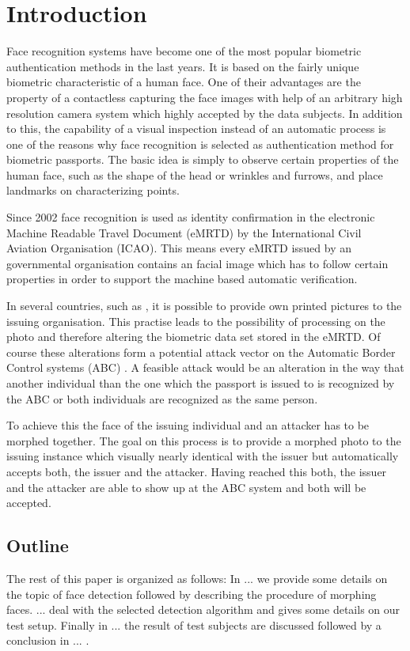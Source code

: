 \section{Introduction}
Face recognition systems have become one of the most popular biometric authentication methods in the last years. It is based on the fairly unique biometric characteristic of a human face. One of their advantages are the property of a contactless capturing the face images with help of an arbitrary high resolution camera system which highly accepted by the data subjects. In addition to this, the capability of a visual inspection instead of an automatic process is one of the reasons why face recognition is selected as authentication method for biometric passports. 
The basic idea is simply to observe certain properties of the human face, such as the shape of the head or wrinkles and furrows, and place landmarks on characterizing points. 


Since 2002  face recognition is used as identity confirmation in the electronic 
Machine Readable Travel Document (eMRTD) by the  International Civil Aviation Organisation (ICAO). This means every eMRTD issued by an governmental organisation contains an facial image which has to follow certain properties in order to support the machine based automatic verification. 

In several countries, such as , it is possible to provide own printed pictures to the issuing organisation. This practise leads to the possibility of processing on the photo and therefore altering the biometric data set stored in the eMRTD. Of course these alterations form a potential attack vector on the Automatic Border Control systems (ABC) . A feasible attack would be an alteration in the way that another individual than the one which the passport is issued to is recognized by the ABC or both individuals are recognized as the same person. 

To achieve this the face of the issuing individual and an attacker has to be morphed together. The goal on this process is to provide a morphed photo to the issuing instance which visually nearly identical with the issuer but automatically accepts both, the issuer and the attacker. Having reached this both, the issuer and the attacker are able to show up at the ABC system and both will be accepted. 


\subsection*{Outline}
The rest of this paper is organized as follows: In ... we provide some details on the topic of face detection followed by describing the procedure of morphing faces. ... deal with the selected detection algorithm and gives some details on our test setup. Finally in ... the result of test subjects are discussed followed by a conclusion in ... .
 